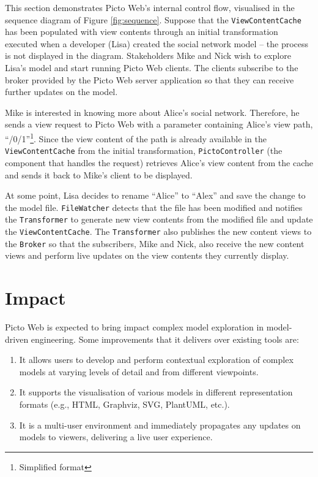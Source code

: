 \documentclass[preprint,12pt, a4paper]{elsarticle}
\begin{document}
This section demonstrates Picto Web's internal control flow, visualised in the sequence diagram of Figure \ref{fig:sequence}. Suppose that the \texttt{ViewContentCache} has been populated with view contents through an initial transformation executed when a developer (Lisa) created the social network model -- the process is not displayed in the diagram. Stakeholders Mike and Nick wish to explore Lisa's model and start running Picto Web clients. The clients subscribe to the broker provided by the Picto Web server application so that they can receive further updates on the model. 

Mike is interested in knowing more about Alice's social network. Therefore, he sends a view request to Picto Web with a parameter containing Alice's view path, ``/0/1''\footnote{Simplified format}. Since the view content of the path is already available in the \texttt{View\-Content\-Cache} from the initial transformation, \texttt{Picto\-Controller} (the component that handles the request) retrieves Alice's view content from the cache and sends it back to Mike's client to be displayed.

At some point, Lisa decides to rename ``Alice'' to ``Alex'' and save the change to the model file. \texttt{File\-Watcher} detects that the file has been modified and notifies the \texttt{Transformer} to generate new view contents from the modified file and update the \texttt{View\-Content\-Cache}. The \texttt{Transformer} also publishes the new content views to the \texttt{Broker} so that the subscribers, Mike and Nick, also receive the new content views and perform live updates on the view contents they currently display.

\section{Impact}
Picto Web is expected to bring impact complex model exploration in model-driven engineering. Some improvements that it delivers over existing tools\cite{sprotty2022git,schneider2013just,dimitris2020picto} are: 
\begin{enumerate}
\item It allows users to develop and perform contextual exploration of complex models at varying levels of detail and from different viewpoints.
\item It supports the visualisation of various models in different representation formats (e.g., HTML, Graphviz, SVG, PlantUML, etc.).
\item It is a multi-user environment and immediately propagates any updates on models to viewers, delivering a live user experience. 
\end{enumerate}
\end{document}
